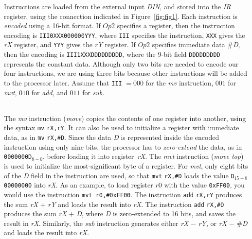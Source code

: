\documentclass[epsfig,10pt,fullpage]{article}
\begin{document}
\noindent
Instructions are loaded from the external input {\it DIN}, and stored into the {\it IR} register, 
using the connection indicated in Figure~\ref{fig:fig1}. Each instruction is {\it encoded} using 
a 16-bit format. If $Op2$ specifies a register, then the instruction encoding is 
\texttt{III0XXX000000YYY}, where \texttt{III} specifies the instruction, \texttt{XXX} gives 
the {\it rX} register, and \texttt{YYY} gives the {\it rY} register. If $Op2$ specifies 
immediate data \#{\it D}, then the encoding is 
\texttt{III1XXXDDDDDDDDD}, where the 9-bit field \texttt{DDDDDDDDD} represents the constant data.
Although only two bits are needed to encode our four instructions, we are using three bits because 
other instructions will be added to the processor later. Assume that \texttt{III} $= 000$ for
the {\it mv} instruction, $001$ for {\it mvt}, $010$ for {\it add}, and $011$ for {\it sub}. 

~\\
The {\it mv} instruction ({\it move}) copies the contents of one register into 
another, using the syntax \texttt{mv} \texttt{rX,rY}. It can also be used to initialize a 
register with immediate data, as in \texttt{mv} \texttt{rX,\#D}.  Since the data {\it D} 
is represented inside the encoded instruction using only nine bits, the processor has to 
{\it zero-extend} the data, as in \texttt{0000000D$_{8-0}$}, before loading it into 
register~{\it rX}.  The {\it mvt} instruction ({\it move top}) is used to initialize the 
most-significant byte of a register.  For {\it mvt}, only eight bits of the {\it D} field in 
the instruction are used, so that \texttt{mvt} \texttt{rX,\#D} loads the value 
\texttt{D$_{15-8}$00000000} into {\it rX}. As an example, to load register $r0$ with the 
value \texttt{0xFF00}, you would use the instruction \texttt{mvt r0,\#0xFF00}.  The instruction 
\texttt{add} \texttt{rX,rY} produces the sum {\it rX} $+$ {\it rY} and loads the result 
into {\it rX}. The instruction \texttt{add} \texttt{rX,\#D} produces the 
sum {\it rX} $+$ {\it D}, where {\it D} is zero-extended to 16 bits, and saves the result 
in {\it rX}. Similarly, the {\it sub} instruction generates 
either {\it rX} $-$ {\it rY}, or {\it rX} $-$ \#{\it D} and loads the result into {\it rX}.
\end{document}
